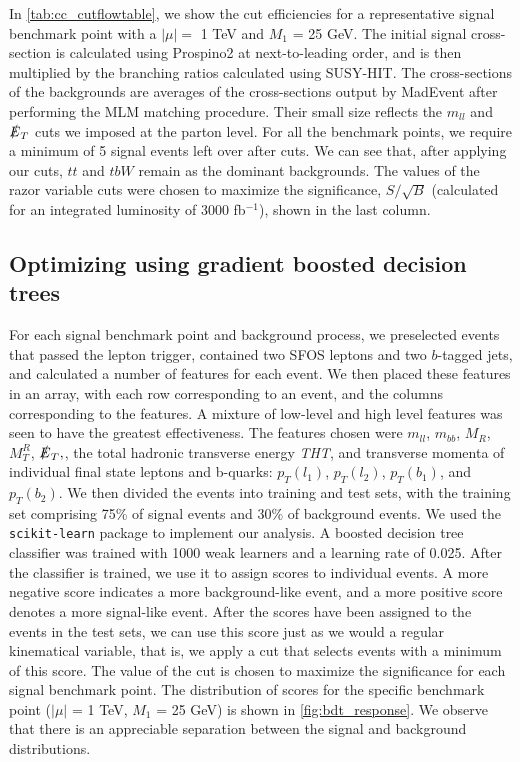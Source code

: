In \autoref{tab:cc_cutflowtable}, we show the cut efficiencies for a representative signal benchmark point with a $|\mu| = $ 1 TeV and $M_1$ = 25 GeV. The initial signal cross-section is calculated using Prospino2 at next-to-leading order, and is then multiplied by the branching ratios calculated using SUSY-HIT. The cross-sections of the backgrounds are averages of the cross-sections output by MadEvent after performing the MLM matching procedure. Their small size reflects the $m_{ll}$ and $\slashed{E}_T$ cuts we imposed at the parton level. For all the benchmark points, we require a minimum of 5 signal events left over after cuts. We can see that, after applying our cuts, $tt$ and $tbW$ remain as the dominant backgrounds. The values of the razor variable cuts were chosen to maximize the significance, $S/\sqrt{B}$ (calculated for an integrated luminosity of 3000 fb$^{-1}$), shown in the last column.

\subsection{Optimizing using gradient boosted decision trees}\label{subsec:bdt}

For each signal benchmark point and background process, we preselected events that passed the lepton trigger, contained two SFOS leptons and two $b$-tagged jets, and calculated a number of features for each event. We then placed these features in an array, with each row corresponding to an event, and the columns corresponding to the features. A mixture of low-level and high level features was seen to have the greatest effectiveness. The features chosen were $m_{ll}$, $m_{bb}$, $M_R$, $M_T^R$, $\slashed{E}_T,$, the total hadronic transverse energy \emph{THT}, and transverse momenta of individual final state leptons and b-quarks: $p_T(l_1)$, $p_T(l_2)$, $p_T(b_1)$, and $p_T(b_2)$. We then divided the events into training and test sets, with the training set comprising 75\% of signal events and 30\% of background events. We used the \texttt{scikit-learn} package  \citep{Pedregosa2011} to implement our analysis. A boosted decision tree classifier was trained with 1000 weak learners and a learning rate of 0.025. After the classifier is trained, we use it to assign scores to individual events. A more negative score indicates a more background-like event, and a more positive score denotes a more signal-like event. After the scores have been assigned to the events in the test sets, we can use this score just as we would a regular kinematical variable, that is, we apply a cut that selects events with a minimum of this score. The value of the cut is chosen to maximize the significance for each signal benchmark point. The distribution of scores for the specific benchmark point ($|\mu|$ = 1 TeV, $M_1$ = 25 GeV) is shown in \autoref{fig:bdt_response}. We observe that there is an appreciable separation between the signal and background distributions.

